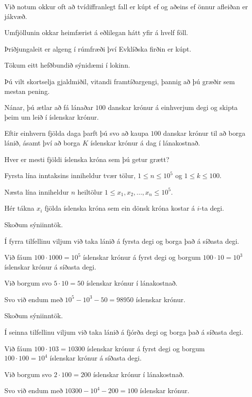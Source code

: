 {
	{
		\item<1-> Við notum okkur oft að tvídiffranlegt fall er kúpt ef og aðeins ef önnur afleiðan er jákvæð.
		\item<2-> Umfjöllunin okkar heimfærist á eðlilegan hátt yfir á hvelf föll.
		\item<3-> Þriðjungaleit er algeng í rúmfræði því Evklíðska firðin er kúpt.
	}
}

{
}

{
	{
		\item<1-> Tökum eitt hefðbundið sýnidæmi í lokinn.
		\item<2-> Þú vilt skortselja gjaldmiðil, vitandi framtíðargengi, þannig að þú græðir sem mestan pening.
		\item<3-> Nánar, þú ætlar að fá lánaðar $100$ danskar krónur á einhverjum degi og skipta þeim um leið í íslenskar krónur.
		\item<4-> Eftir einhvern fjölda daga þarft þú svo að kaupa $100$ danskar krónur til að borga lánið,
					ásamt því að borga $K$ íslenskar krónur á dag í lánakostnað.
		\item<5-> Hver er mesti fjöldi íslenska króna sem þú getur grætt?
		\item<6-> Fyrsta lína inntaksins inniheldur tvær tölur, $1 \leq n \leq 10^5$ og $1 \leq k \leq 100$.
		\item<7-> Næsta lína inniheldur $n$ heiltölur $1 \leq x_1, x_2, ..., x_n \leq 10^5$.
		\item<8-> Hér tákna $x_i$ fjölda íslenska króna sem ein dönsk króna kostar á $i$-ta degi.
	}
}

{
	{
		\item<1-> Skoðum sýniinntök.
		\item<2->[]
		\item<3-> Í fyrra tilfellinu viljum við taka lánið á fyrsta degi og borga það á síðasta degi.
		\item<4-> Við fáum $100 \cdot 1000 = 10^5$ íslenskar krónur á fyrst degi og borgum $100 \cdot 10 = 10^3$ íslenskar krónur á síðasta degi.
		\item<5-> Við borgum svo $5 \cdot 10 = 50$ íslenskar krónur í lánakostnað.
		\item<6-> Svo við endum með $10^5 - 10^3 - 50 = 98950$ íslenskar krónur.
	}
}

{
	{
		\item<1-> Skoðum sýniinntök.
		\item<1->[]
		\item<1-> Í seinna tilfellinu viljum við taka lánið á fjórða degi og borga það á síðasta degi.
		\item<2-> Við fáum $100 \cdot 103 = 10300$ íslenskar krónur á fyrst degi og borgum $100 \cdot 100 = 10^4$ íslenskar krónur á síðasta degi.
		\item<3-> Við borgum svo $2 \cdot 100 = 200$ íslenskar krónur í lánakostnað.
		\item<4-> Svo við endum með $10300 - 10^4 - 200 = 100$ íslenskar krónur.
	}
}

